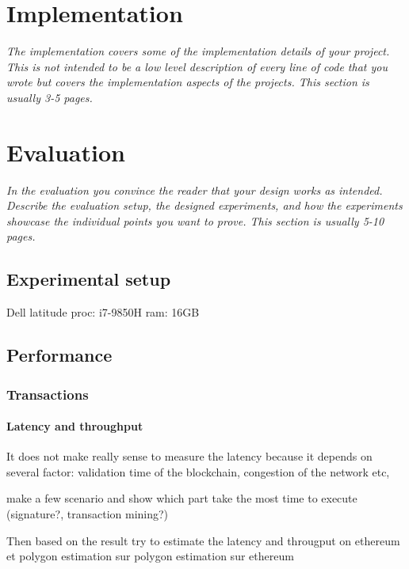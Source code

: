 \documentclass[a4paper,11pt,oneside]{report}
\begin{document}
\chapter{Implementation}

\textit{The implementation covers some of the implementation details of your project.
This is not intended to be a low level description of every line of code that
you wrote but covers the implementation aspects of the projects.
This section is usually 3-5 pages.} \\


\chapter{Evaluation}

\textit{In the evaluation you convince the reader that your design works as intended.
Describe the evaluation setup, the designed experiments, and how the
experiments showcase the individual points you want to prove.
This section is usually 5-10 pages.} \\

\section{Experimental setup}
Dell latitude 
proc: i7-9850H
ram: 16GB


\section{Performance}

\subsection{Transactions}

\subsubsection{Latency and throughput}
It does not make really sense to measure the latency because it depends on several factor: validation time of the blockchain, congestion of the network etc,


make a few scenario and show which part take the most time to execute (signature?, transaction mining?)


Then based on the result try to estimate the latency and througput on ethereum et polygon
estimation sur polygon
estimation sur ethereum
\end{document}
